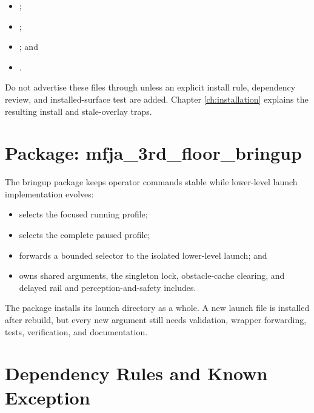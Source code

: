 \begin{itemize}
  \item {};
  \item {};
  \item {}; and
  \item {}.
\end{itemize}

Do not advertise these files through  unless an explicit install
rule, dependency review, and installed-surface test are added. Chapter
\ref{ch:installation} explains the resulting install and stale-overlay traps.

\section{Package: mfja\_3rd\_floor\_bringup}

The bringup package keeps operator commands stable while lower-level launch
implementation evolves:

\begin{itemize}
  \item {} selects
        the focused running profile;
  \item {} selects the
        complete paused profile;
  \item {}
        forwards a bounded selector to the isolated lower-level launch; and
  \item {} owns
        shared arguments, the singleton lock, obstacle-cache clearing, and
        delayed rail and perception-and-safety includes.
\end{itemize}

The package installs its launch directory as a whole. A new launch file is
installed after rebuild, but every new argument still needs validation,
wrapper forwarding, tests,  verification, and documentation.

\section{Dependency Rules and Known Exception}

